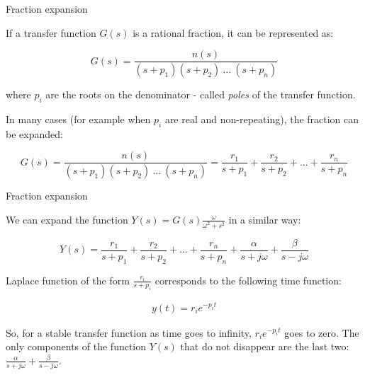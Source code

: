 \documentclass{beamer}
\begin{document}
\begin{frame}{Fraction expansion}
	\begin{flushleft}
		
		If a transfer function $G(s)$ is a rational fraction, it can be represented as:
		
		\begin{equation}
			G(s) = \frac{n(s)}{(s + p_1)(s + p_2) \ ... \ (s + p_n)}
		\end{equation}		
	
		where $p_i$ are the roots on the denominator - called \emph{poles} of the transfer function.
		
		\bigskip
		
		In many cases (for example when $p_i$ are real and non-repeating), the fraction can be expanded:
		
		\begin{equation*}
			G(s) = \frac{n(s)}{(s + p_1)(s + p_2) \ ... \ (s + p_n)} = \frac{r_1}{s + p_1} + \frac{r_2}{s + p_2} + ... + \frac{r_n}{s + p_n}
		\end{equation*}		
		
		
	\end{flushleft}
\end{frame}



\begin{frame}{Fraction expansion}
	\begin{flushleft}
		
		We can expand the function $Y(s) = G(s)\frac{\omega}{\omega^2 + s^2}$ in a similar way:
		
		\begin{equation*}
			Y(s) = \frac{r_1}{s + p_1} + \frac{r_2}{s + p_2} + ... + \frac{r_n}{s + p_n} + \frac{\alpha}{s + j\omega} + \frac{\beta}{s - j\omega}
		\end{equation*}		
	
		Laplace function of the form $\frac{r_i}{s + p_i}$ corresponds to the following time function:
		
		\begin{align}
			y(t) = r_i e^{-p_i t}
		\end{align} 
	
		So, for a stable transfer function as time goes to infinity, $r_i e^{-p_i t}$ goes to zero. The only components of the function $Y(s)$ that do not disappear are the last two: $\frac{\alpha}{s + j\omega} + \frac{\beta}{s - j\omega}$.
		
		
	\end{flushleft}
\end{frame}
\end{document}
